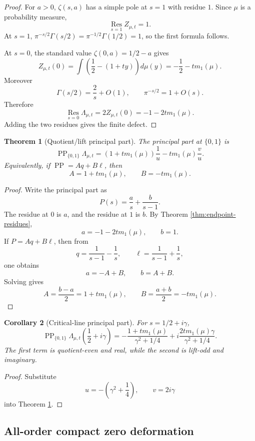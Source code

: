 \documentclass[11pt]{article}
\newcommand{\PP}{\operatorname{PP}}
\newcommand{\Res}{\operatorname*{Res}}
\theoremstyle{plain}
\newtheorem{theorem}{Theorem}[section]
\newtheorem{corollary}[theorem]{Corollary}
\theoremstyle{definition}
\numberwithin{equation}{section}
\begin{document}
\begin{proof}
For \(a>0\), \(\zeta(s,a)\) has a simple pole at \(s=1\) with residue \(1\).  Since \(\mu\) is a probability measure,
\[
 \Res_{s=1}Z_{\mu,t}=1.
\]
At \(s=1\), \(\pi^{-s/2}\Gamma(s/2)=\pi^{-1/2}\Gamma(1/2)=1\), so the first formula follows.

At \(s=0\), the standard value \(\zeta(0,a)=1/2-a\) gives
\[
 Z_{\mu,t}(0)=\int\left(\frac12-(1+ty)\right)d\mu(y)=-\frac12-tm_1(\mu).
\]
Moreover
\[
 \Gamma(s/2)=\frac2s+O(1),
 \qquad
 \pi^{-s/2}=1+O(s).
\]
Therefore
\[
 \Res_{s=0}\Lambda_{\mu,t}=2Z_{\mu,t}(0)=-1-2tm_1(\mu).
\]
Adding the two residues gives the finite defect.
\end{proof}

\begin{theorem}[Quotient/lift principal part]\label{thm:principal-part}
The principal part at \(\{0,1\}\) is
\[
 \PP_{\{0,1\}}\Lambda_{\mu,t}=
 (1+tm_1(\mu))\frac1u-tm_1(\mu)\frac vu.
\]
Equivalently, if \(\PP=Aq+B\ell\), then
\[
 A=1+tm_1(\mu),
 \qquad
 B=-tm_1(\mu).
\]
\end{theorem}

\begin{proof}
Write the principal part as
\[
 P(s)=\frac as+\frac b{s-1}.
\]
The residue at \(0\) is \(a\), and the residue at \(1\) is \(b\).  By Theorem \ref{thm:endpoint-residues},
\[
 a=-1-2tm_1(\mu),
 \qquad
 b=1.
\]
If \(P=Aq+B\ell\), then from
\[
 q=\frac1{s-1}-\frac1s,
 \qquad
 \ell=\frac1{s-1}+\frac1s,
\]
one obtains
\[
 a=-A+B,
 \qquad
 b=A+B.
\]
Solving gives
\[
 A=\frac{b-a}{2}=1+tm_1(\mu),
 \qquad
 B=\frac{a+b}{2}=-tm_1(\mu).
\]
\end{proof}

\begin{corollary}[Critical-line principal part]
For \(s=1/2+i\gamma\),
\[
 \PP_{\{0,1\}}\Lambda_{\mu,t}\left(\frac12+i\gamma\right)=
 -\frac{1+tm_1(\mu)}{\gamma^2+1/4}
 +i\frac{2tm_1(\mu)\gamma}{\gamma^2+1/4}.
\]
The first term is quotient-even and real, while the second is lift-odd and imaginary.
\end{corollary}

\begin{proof}
Substitute
\[
 u=-\left(\gamma^2+\frac14\right),
 \qquad
 v=2i\gamma
\]
into Theorem \ref{thm:principal-part}.
\end{proof}

\subsection{All-order compact zero deformation}
\end{document}
